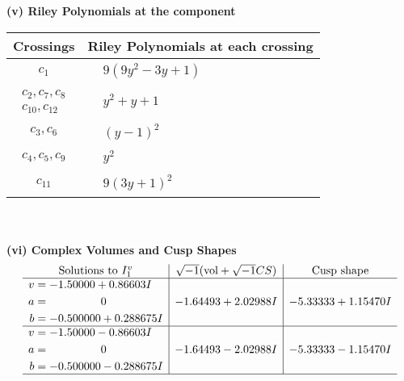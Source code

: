 \documentclass[1p]{elsarticle_modified}
\theoremstyle{definition}
\newcommand{\I}{\sqrt{-1}}
\begin{document}
\newpage\renewcommand{\arraystretch}{1}
\flushleft \textbf{(v) Riley Polynomials at the component}\newline \\
\begin{tabular}{m{50pt}|m{274pt}}
Crossings & \hspace{64pt}Riley Polynomials at each crossing \\
\hline $$\begin{aligned}c_{1}\end{aligned}$$&$\begin{aligned}
&9(9 y^2-3 y+1)
\end{aligned}$\\
\hline $$\begin{aligned}c_{2},c_{7},c_{8}\\c_{10},c_{12}\end{aligned}$$&$\begin{aligned}
&y^2+y+1
\end{aligned}$\\
\hline $$\begin{aligned}c_{3},c_{6}\end{aligned}$$&$\begin{aligned}
&(y-1)^2
\end{aligned}$\\
\hline $$\begin{aligned}c_{4},c_{5},c_{9}\end{aligned}$$&$\begin{aligned}
&y^2
\end{aligned}$\\
\hline $$\begin{aligned}c_{11}\end{aligned}$$&$\begin{aligned}
&9(3 y+1)^2
\end{aligned}$\\
\hline
\end{tabular}\\~\\
\newpage\flushleft \textbf{(vi) Complex Volumes and Cusp Shapes}
$$\begin{array}{c|c|c}  
\text{Solutions to }I^v_{1}& \I (\text{vol} + \sqrt{-1}CS) & \text{Cusp shape}\\
 \hline 
\begin{aligned}
v &= -1.50000 + 0.86603 I \\
a &= \phantom{-0.000000 } 0 \\
b &= -0.500000 + 0.288675 I\end{aligned}
 & -1.64493 + 2.02988 I & -5.33333 + 1.15470 I \\ \hline\begin{aligned}
v &= -1.50000 - 0.86603 I \\
a &= \phantom{-0.000000 } 0 \\
b &= -0.500000 - 0.288675 I\end{aligned}
 & -1.64493 - 2.02988 I & -5.33333 - 1.15470 I\\
 \hline 
 \end{array}$$\newpage
\end{document}
